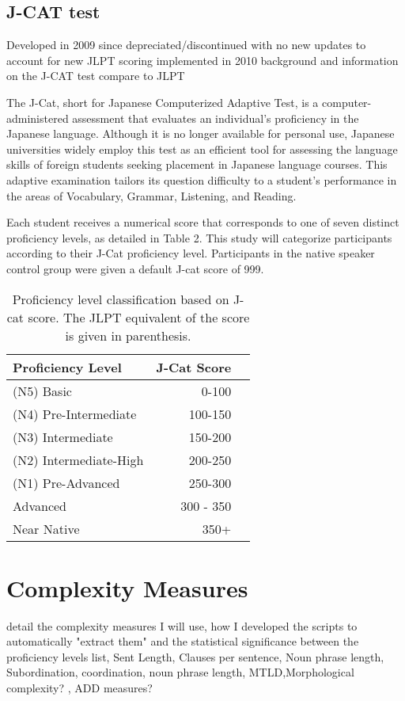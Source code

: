 \subsection{J-CAT test}
Developed in 2009 since depreciated/discontinued with no new updates to account for new JLPT scoring implemented in 2010
background and information on the J-CAT test compare to JLPT


The J-Cat, short for Japanese Computerized Adaptive Test, is a computer-administered assessment that evaluates an individual's proficiency in the Japanese language. Although it is no longer available for personal use, Japanese universities widely employ this test as an efficient tool for assessing the language skills of foreign students seeking placement in Japanese language courses. This adaptive examination tailors its question difficulty to a student's performance in the areas of Vocabulary, Grammar, Listening, and Reading.

Each student receives a numerical score that corresponds to one of seven distinct proficiency levels, as detailed in Table 2. This study will categorize participants according to their J-Cat proficiency level. Participants in the native speaker control group were given a default J-cat score of 999.

\begin{table}
\centering
\begin{tabular}{lrl}
\hline \textbf{Proficiency Level} & \textbf{J-Cat Score}  \\ \hline
(N5) Basic & 0-100 \\
(N4) Pre-Intermediate & 100-150 \\
(N3) Intermediate & 150-200 \\
(N2) Intermediate-High & 200-250 \\
(N1) Pre-Advanced & 250-300 \\
Advanced & 300 - 350 \\
Near Native & 350+\\
\hline
\end{tabular}
\caption{\label{proficency-table} Proficiency level classification based on J-cat score. The JLPT equivalent of the score is given in parenthesis.}
\end{table}


\section{Complexity Measures}
detail the complexity measures I will use, how I developed the scripts to automatically "extract them" and the statistical significance between the proficiency levels
list, Sent Length, Clauses per sentence, Noun phrase length,  Subordination, coordination, noun phrase length, MTLD,Morphological complexity? , ADD measures?

